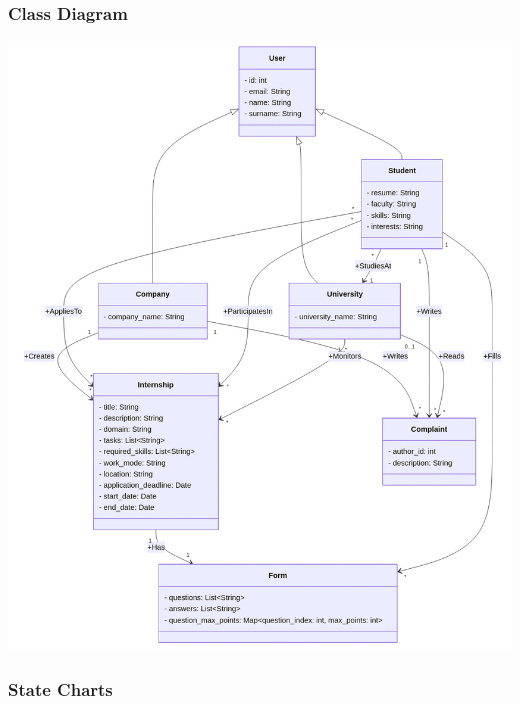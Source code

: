 \documentclass[11pt,twoside]{article}
\begin{document}
		\subsubsection{Class Diagram}
		\includegraphics[scale=0.5]{Images/Class_Diagram}\\
		\subsubsection{State Charts}
	
\end{document}
